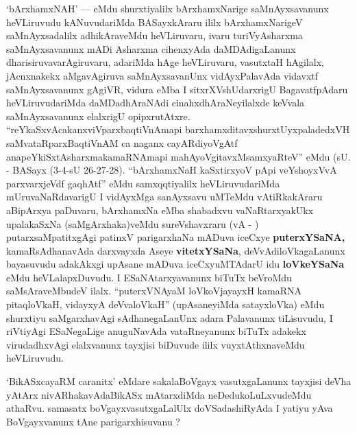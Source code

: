 \begin{artha}
`bArxhamxNAH' --- eMdu shurxtiyalilx bArxhamxNarige saMnAyxsavanunx heVLiruvudu kANuvudariMda BASayxkAraru ililx bArxhamxNarigeV saMnAyxsadalilx adhikAraveMdu heVLi\-ruvaru, ivaru turiVyAsharxma saMnAyxsavanunx mADi Asharxma cihenxyAda daMDAdi\-gaLanunx dharisiruvavarAgiruvaru, adariMda hAge heVLiruvaru, vasutxtaH \-hAgilalx, jAcnxnakekx aMgavAgiruva saMnAyxsavanUnx vidAyxPalavAda vidavxtf saMnAyxsavanunx \break gAgiVR, vidura eMba I sitxrXVshUdarxrigU BagavatfpAdaru heVLiruvudariMda daMDa\-dhAraNAdi cinahxdhAraNeyilalxde keVvala saMnAyxsavanunx elalxrigU opipxrutAtxre. ``reYkaSxvAcakanxviVparxbaqtiVnAmapi barxhamxditavxshurxtUyxpaladedxVH saMvataRparxBaqtiVnAM ca naganx cayARdiyoVgAtf anapeYkiSxtAsharxmakamaRNAmapi mahAyoVgitavxMsamxyaRteV'' \-eMdu (sU. - BASayx (3-4-sU 26-27-28). ``bArxhamxNaH kaSxtirxyoV pApi veYshoyxVvA parxvarxjeVdf gaqhAtf'' eMdu samxqqtiyalilx heVLiruvudariMda mUruvaNaR\-davarigU I vidAyxMga sanAyxsavu uMTeMdu vAtiRkakAraru aBipArxya \-paDuvaru, bArxhamxNa eMba shabadxvu vaNaRtarxyakUkx upalakaSxNa (saMgArxhaka)veMdu sureVshavxraru (vA - ) putarxsaMpatitxgAgi patinxV parigarxhaNa mADuva iceCxye {\bf puterxYSaNA,} kamaR\-sAdhanavAda darxvayxda Aseye {\bf vitetxYSaNa}, deVvAdiloVkagaLanunx bayasuvudu adakAkxgi upAsane mADuva iceCxyuMTAdarU idu {\bf loVkeYSaNa} eMdu heVLalapxDuvudu. I ESaNAtarxyavanunx biTuTx beVroMdu saMsAraveMbudeV ilalx. ``puterxVNAyaM loVkoVjayayxH kamaRNA pitaqloVkaH, vidayxyA deVvaloVkaH'' (upAsane\-yiMda satayxloVka) eMdu shurxtiyu saMgarxhavAgi sAdhanegaLanUnx adara Palavanunx tiLisu\-vudu, I riVtiyAgi ESaNegaLige anuguNavAda vataRneyanunx biTuTx adakekx virudadhx\-vAgi elalxvanunx tayxjisi biDuvude ililx vuyxtAthxnaveMdu heVLiruvudu.
\end{artha}

\begin{artha}
`BikASxcayaRM caranitx' eMdare sakalaBoVgayx vasutxgaLanunx tayxjisi deVha yAtArx nivARhakavAdaBikASx mAtarxdiMda neDedukoLuLxvudeMdu athaRvu. samasatx boVgayxvasutxgaLalUlx doVSadashiRyAda I yatiyu yAva BoVgayxvanunx tAne parigarxhisuvanu ?
\end{artha}

